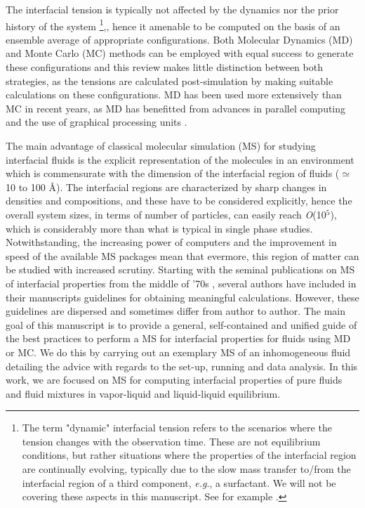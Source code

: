 \documentclass[9pt,bestpractices]{livecoms}
\begin{document}
The interfacial tension is typically not affected by the dynamics nor the prior
history of the system \footnote{The term "dynamic" interfacial tension
refers to the scenarios where the tension changes with the observation time.
These are not equilibrium conditions, but rather situations where the
properties of the interfacial region are continually evolving, typically due to
the slow mass transfer to/from the interfacial region of a third component,
\textit{e.g}., a surfactant. We will not be covering these aspects in this
manuscript. See for example \citet{dukhin1995}.},\citep{rowlinson1982}, hence it amenable to be computed on
the basis of an ensemble average of appropriate configurations. Both Molecular
Dynamics (MD) \citep{allen2017} and Monte Carlo (MC) \citep{frenkel2002} methods can be employed
with equal success to generate these configurations and this review makes
little distinction between both strategies, as the tensions are calculated
post-simulation by making suitable calculations on these configurations. MD has
been used more extensively than MC in recent years, as MD has benefitted from
advances in parallel computing and the use of graphical processing units \citep{faraday2014}.

The main advantage of classical molecular simulation (MS) for studying
interfacial fluids is the explicit representation of the molecules in an
environment which is commensurate with the dimension of the interfacial region
of fluids (${\simeq}$ 10 to 100 \AA{}). The interfacial regions are
characterized by sharp changes in densities and compositions, and these have to
be considered explicitly, hence the overall system sizes, in terms of number of
particles, can easily reach \textit{O}(10$^{5}$), which is considerably more
than what is typical in single phase studies. Notwithstanding, the increasing
power of computers and the improvement in speed of the available MS packages
mean that evermore, this region of matter can be studied with increased
scrutiny. Starting with the seminal publications on MS of interfacial
properties from the middle of '70s \citep{liu1974}, several
authors have included in their manuscripts guidelines for obtaining meaningful
calculations. However, these guidelines are dispersed and sometimes differ from
author to author. The main goal of this manuscript is to provide a general,
self-contained and unified guide of the best practices to perform a MS for
interfacial properties for fluids using MD or MC. We do this by carrying out an
exemplary MS of an inhomogeneous fluid detailing the advice with regards to the
set-up, running and data analysis. In this work, we are focused on MS for
computing interfacial properties of pure fluids and fluid mixtures in
vapor-liquid and liquid-liquid equilibrium. 
\end{document}
